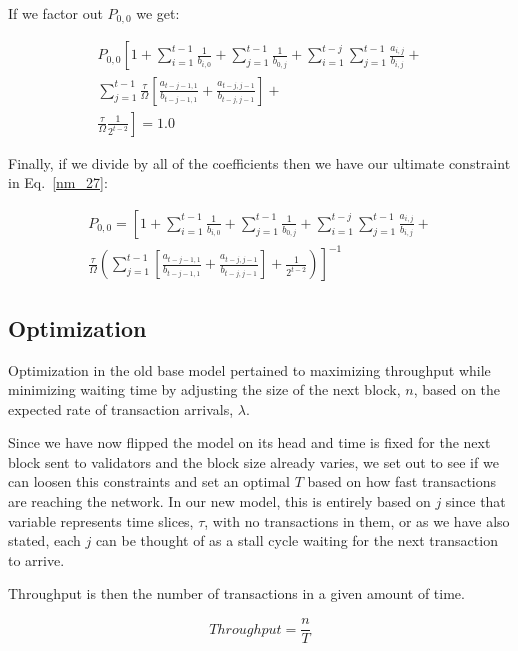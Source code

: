 \documentclass[conference]{IEEEtran}
\begin{document}
If we factor out $P_{0,0}$ we get:

\begin{multline}
  P_{0,0} \left[1 +  \sum_{i = 1}^{t-1}{\frac{1}{b_{i,0}}} + \sum_{j = 1}^{t-1}{\frac{1}{b_{0,j}}} + \right.
  \left.\sum_{i=1}^{t-j}{\sum_{j=1}^{t-1}{\frac{a_{i,j}}{b_{i,j}}}} + \right.\\
  \left.\sum_{j=1}^{t-1}{\frac{\tau}{\Omega}\left[\frac{a_{t-j-1,1}}{b_{t-j-1,1}} + \frac{a_{t-j,j-1}}{b_{t-j,j-1}}\right]} + \right.\\
  \left.\frac{\tau}{\Omega}\frac{1}{2^{t-2}}\right] = 1.0 \label{nm_26}
\end{multline}

Finally, if we divide by all of the coefficients then we have our ultimate constraint in Eq.~\ref{nm_27}:

\begin{multline}
  P_{0,0} = \left[1 +  \sum_{i = 1}^{t-1}{\frac{1}{b_{i,0}}} + \sum_{j = 1}^{t-1}{\frac{1}{b_{0,j}}} + 
  \sum_{i=1}^{t-j}{\sum_{j=1}^{t-1}{\frac{a_{i,j}}{b_{i,j}}}} + \right.\\
  \left.\frac{\tau}{\Omega}\left(\sum_{j=1}^{t-1}{\left[\frac{a_{t-j-1,1}}{b_{t-j-1,1}} + \frac{a_{t-j,j-1}}{b_{t-j,j-1}}\right]} + 
  \frac{1}{2^{t-2}}\right)\right]^{-1} \label{nm_27}
\end{multline}


\subsection{Optimization}\label{optimization}  

Optimization in the old base model pertained to maximizing throughput
while minimizing waiting time by adjusting the size of the next block, $n$,
based on the expected rate of transaction arrivals, $\lambda$. 

Since we have now flipped the model on its head and time is fixed for the next
block sent to validators and the block size already varies, we set out to see if
we can loosen this constraints and set an optimal $T$ based on how fast 
transactions are reaching the network. In our new model, this is entirely based
on $j$ since that variable represents time slices, $\tau$, with no transactions in them,
or as we have also stated, each $j$ can be thought of as a stall cycle waiting for
the next transaction to arrive.

Throughput is then the number of transactions in a given amount of time. 

\begin{equation}
  Throughput = \frac{n}{T}\label{opt_1}
\end{equation}
\end{document}
